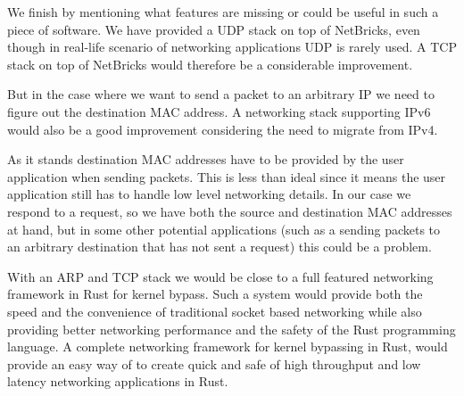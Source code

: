 We finish by mentioning what features are missing or could be useful
in such a piece of software. We have provided a UDP stack on top of
NetBricks, even though in real-life scenario of networking
applications UDP is rarely used. A TCP stack on top of NetBricks would
therefore be a considerable improvement.

But in the case where we want to
send a packet to an arbitrary IP we need to figure out the destination
MAC address. A networking stack supporting IPv6 would also be a good
improvement considering the need to migrate from IPv4.

As it stands destination MAC addresses have to be provided by the user
application when sending packets. This is less than ideal since it
means the user application still has to handle low level networking
details. In our case we respond to a request, so we have both the
source and destination MAC addresses at hand, but in some other
potential applications (such as a sending packets to an arbitrary
destination that has not sent a request) this could be a problem.

With an ARP and TCP stack we would be close to a full featured
networking framework in Rust for kernel bypass. Such a system would
provide both the speed and the convenience of traditional socket based
networking while also providing better networking performance and the
safety of the Rust programming language. A complete networking
framework for kernel bypassing in Rust, would provide an easy way of
to create quick and safe of high throughput and low latency
networking applications in Rust.

